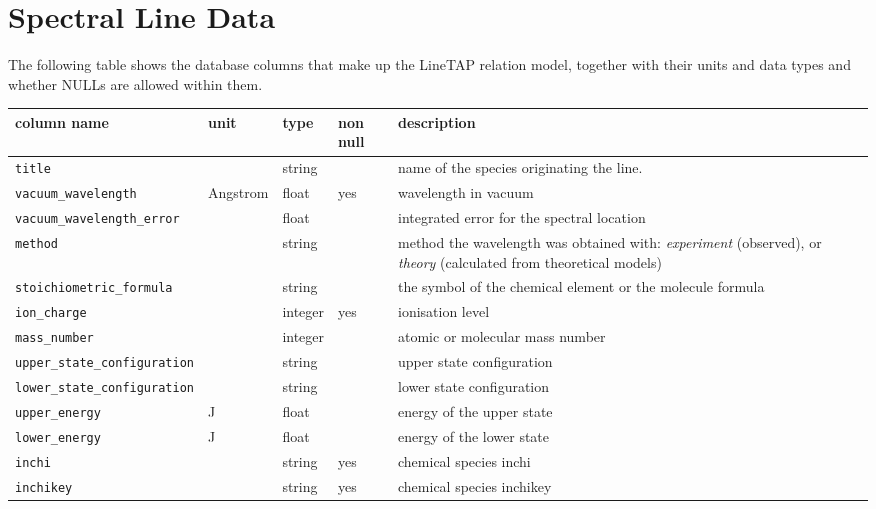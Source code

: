 \documentclass[11pt,a4paper]{ivoa}
\begin{document}
\section{Spectral Line Data}\label{sect:quantities}

The following table shows the database columns that make up the LineTAP
relation model, together with their units and data types and whether
NULLs are allowed within them.


\begin{table}[H]
\small
\begin{tabular}{|l|l|l|p{0.8cm}|p{4cm}|}%
\hline
\textbf{column name} & \textbf{unit} & \textbf{type} & \textbf{non null} &
\textbf{description} \\
\hline
\hline
\texttt{title} & & string & & name of the species originating  the line.  \\
\hline
\texttt{vacuum\_wavelength} & Angstrom & float & yes &  wavelength in vacuum \\
\hline
\texttt{vacuum\_wavelength\_error} & & float & & integrated error for the spectral location \\
\hline
\texttt{method} && string& & method the wavelength was obtained with:
\textit{experiment} (observed), or \textit{theory} (calculated from theoretical models) \\
\hline
\texttt{stoichiometric\_formula} & & string & &  the symbol of the chemical element or the
molecule formula\\
\hline
\texttt{ion\_charge} & & integer & yes & ionisation level\\
\hline
\texttt{mass\_number} & & integer &  & atomic or molecular mass number\\
\hline
\texttt{upper\_state\_configuration} & & string & & upper state configuration\\
\hline
\texttt{lower\_state\_configuration} & & string & & lower state configuration\\
\hline
\texttt{upper\_energy} & J  & float & & energy of the upper state \\
\hline
\texttt{lower\_energy} & J & float & & energy of the lower state\\
\hline
\texttt{inchi} & & string & yes & chemical species inchi \\
\hline
\texttt{inchikey} & & string & yes & chemical species inchikey \\

\end{tabular}
\end{table}
\end{document}
